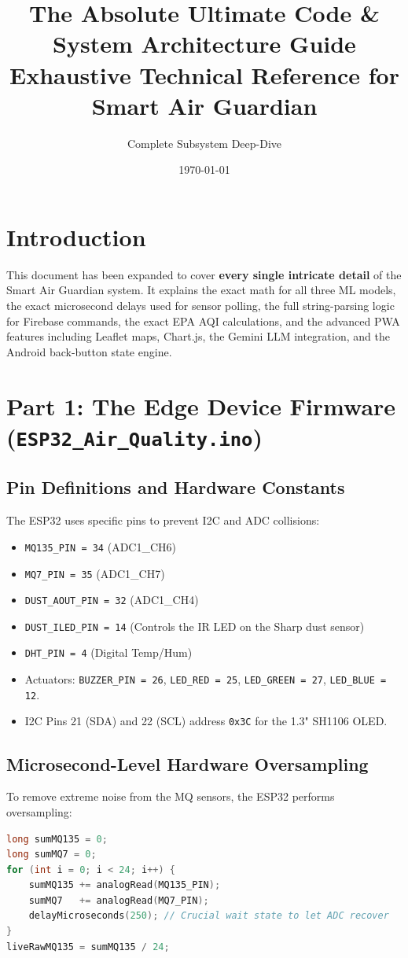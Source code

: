 \documentclass[11pt,a4paper]{article}
\title{\Huge \textbf{The Absolute Ultimate Code \& System Architecture Guide} \\ \vspace{0.5cm} \Large Exhaustive Technical Reference for Smart Air Guardian}
\author{Complete Subsystem Deep-Dive}
\date{\today}
\begin{document}
\maketitle
\tableofcontents
\newpage

\section{Introduction}
This document has been expanded to cover \textbf{every single intricate detail} of the Smart Air Guardian system. It explains the exact math for all three ML models, the exact microsecond delays used for sensor polling, the full string-parsing logic for Firebase commands, the exact EPA AQI calculations, and the advanced PWA features including Leaflet maps, Chart.js, the Gemini LLM integration, and the Android back-button state engine.

\section{Part 1: The Edge Device Firmware (\texttt{ESP32\_Air\_Quality.ino})}

\subsection{Pin Definitions and Hardware Constants}
The ESP32 uses specific pins to prevent I2C and ADC collisions:
\begin{itemize}
    \item \texttt{MQ135\_PIN = 34} (ADC1\_CH6)
    \item \texttt{MQ7\_PIN = 35} (ADC1\_CH7)
    \item \texttt{DUST\_AOUT\_PIN = 32} (ADC1\_CH4)
    \item \texttt{DUST\_ILED\_PIN = 14} (Controls the IR LED on the Sharp dust sensor)
    \item \texttt{DHT\_PIN = 4} (Digital Temp/Hum)
    \item Actuators: \texttt{BUZZER\_PIN = 26}, \texttt{LED\_RED = 25}, \texttt{LED\_GREEN = 27}, \texttt{LED\_BLUE = 12}.
    \item I2C Pins 21 (SDA) and 22 (SCL) address \texttt{0x3C} for the 1.3" SH1106 OLED.
\end{itemize}

\subsection{Microsecond-Level Hardware Oversampling}
To remove extreme noise from the MQ sensors, the ESP32 performs oversampling:
\begin{lstlisting}[language=C++]
long sumMQ135 = 0;
long sumMQ7 = 0;
for (int i = 0; i < 24; i++) {
    sumMQ135 += analogRead(MQ135_PIN);
    sumMQ7   += analogRead(MQ7_PIN);
    delayMicroseconds(250); // Crucial wait state to let ADC recover
}
liveRawMQ135 = sumMQ135 / 24;
\end{lstlisting}
\end{document}
